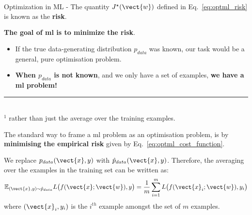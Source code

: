 \begin{frame}[t,allowframebreaks]{
    Optimization in ML -}
    The quantity $ J^{\star}(\vect{w})$ defined in Eq.~\ref{eq:optml_risk} 
    is known as the {\bf {}\gls{risk}}.\\
    \vspace{0.2cm}

    {\bf The goal of \gls{ml} 
    is to minimize the \gls{risk}}.\\
    \vspace{0.2cm}

    \begin{itemize}
        \item
            If the true  
            \gls{data-generating distribution} $p_{data}$ was known, 
            our task would be a general, 
            pure \gls{optimisation} problem.\\
        \item
            {\bf When $p_{data}$ is not known}, 
            and we only have a set of examples,
            {\bf we have a \gls{ml} problem!}\\
    \end{itemize}
    \vspace{0.2cm}

    \noindent\rule{4cm}{0.4pt}\\
    {\small
      $^1$ rather than just the average over the training examples.\\
    }

    \framebreak


    The standard way to frame a \gls{ml} problem
    as an \gls{optimisation} problem, is by
    {\bf minimising the \gls{empirical risk}}
    given by Eq.~\ref{eq:optml_cost_function}.\\
    \vspace{0.2cm}

    We replace $p_{data}(\vect{x},y)$
    with $\hat{p}_{data}(\vect{x},y)$. Therefore,
    the averaging over the examples in the 
    \gls{training set} can be written as:
    \begin{equation}
          \mathbb{E}_{(\vect{x},y){\sim}\hat{p}_{data}}
          L\big(f(\vect{x};\vect{w}),y\big) =
          \frac{1}{m} \sum_{i=1}^{m}
          L\big(f(\vect{x}_{i};\vect{w}),y_{i}\big)
          \label{eq:average_loss_over_examples}    
    \end{equation}
    where $(\vect{x}_{i},y_{i})$ is the $i^{th}$ example
    amongst the set of $m$ examples.\\
    \vspace{0.2cm}


\end{frame}
